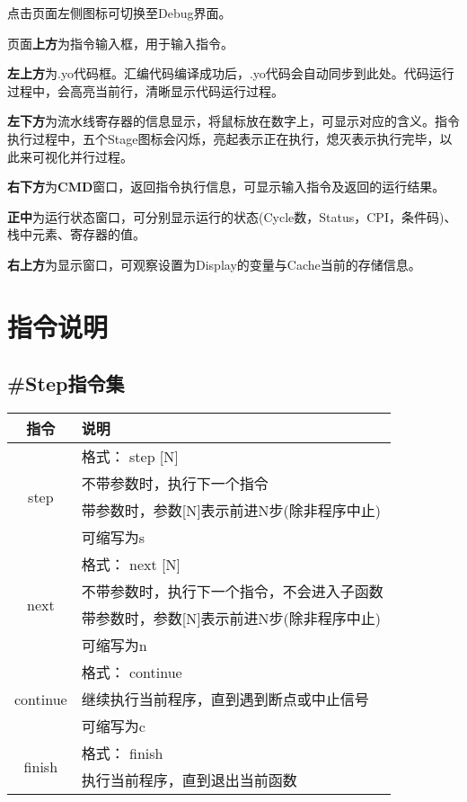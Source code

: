 \documentclass[12pt]{article} %
\begin{document}
\begin{sloppypar}
点击页面左侧图标可切换至Debug界面。

页面{\bf 上方}为指令输入框，用于输入指令。

{\bf 左上方}为.yo代码框。汇编代码编译成功后，.yo代码会自动同步到此处。代码运行过程中，会高亮当前行，清晰显示代码运行过程。

{\bf 左下方}为流水线寄存器的信息显示，将鼠标放在数字上，可显示对应的含义。指令执行过程中，五个Stage图标会闪烁，亮起表示正在执行，熄灭表示执行完毕，以此来可视化并行过程。

{\bf 右下方}为{\bf CMD}窗口，返回指令执行信息，可显示输入指令及返回的运行结果。

{\bf 正中}为运行状态窗口，可分别显示运行的状态(Cycle数，Status，CPI，条件码)、栈中元素、寄存器的值。

{\bf 右上方}为显示窗口，可观察设置为Display的变量与Cache当前的存储信息。

\clearpage
\section{指令说明}

\subsection{\#Step指令集}

\begin{table}[h]
\begin{tabular}{|c|l|}
\hline
{\bf 指令} & {\bf 说明} \\ 
\hline
\multirow{4}{*}{step} & 格式： step [N] \\
 & 不带参数时，执行下一个指令 \\
 & 带参数时，参数[N]表示前进N步(除非程序中止) \\
 & 可缩写为s \\ 
\hline
\multirow{4}{*}{next} & 格式： next [N] \\
 & 不带参数时，执行下一个指令，不会进入子函数 \\
 & 带参数时，参数[N]表示前进N步(除非程序中止) \\
 & 可缩写为n \\ 
\hline
\multirow{3}{*}{continue} & 格式： continue \\
 & 继续执行当前程序，直到遇到断点或中止信号 \\
 & 可缩写为c \\
\hline
\multirow{2}{*}{finish} & 格式： finish \\
 & 执行当前程序，直到退出当前函数 \\
\hline
\end{tabular}
\end{table}


\end{sloppypar}
\end{document}
